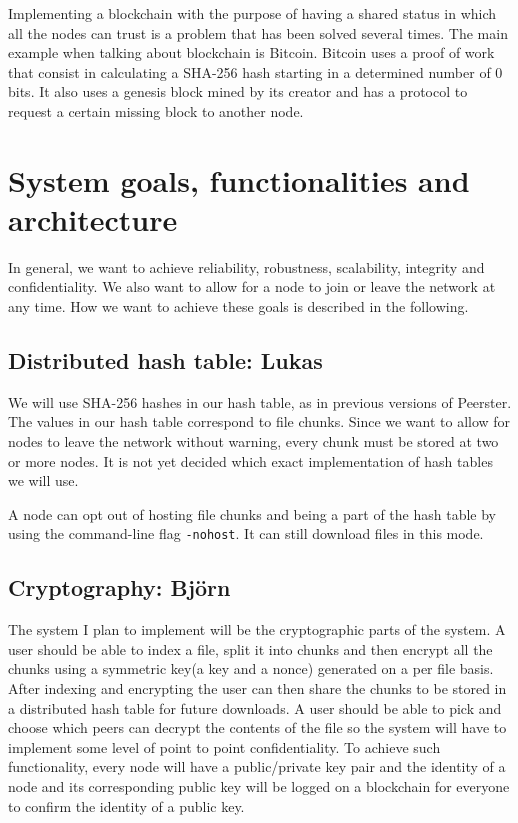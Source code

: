 \documentclass[12pt,a4paper,draft]{article}
\begin{document}
Implementing a blockchain with the purpose of having a shared status in which all the nodes can trust is a problem that has been solved several times. The main example when talking about blockchain is Bitcoin. Bitcoin uses a proof of work that consist in calculating a SHA-256 hash starting in a determined number of 0 bits. It also uses a genesis block mined by its creator and has a protocol to request a certain missing block to another node.

\section{System goals, functionalities and architecture}

In general, we want to achieve reliability, robustness, scalability, integrity and confidentiality.
We also want to allow for a node to join or leave the network at any time.
How we want to achieve these goals is described in the following.

\subsection{Distributed hash table: Lukas}

We will use SHA-256 hashes in our hash table, as in previous versions of Peerster.
The values in our hash table correspond to file chunks.
Since we want to allow for nodes to leave the network without warning, every chunk must be stored at two or more nodes.
It is not yet decided which exact implementation of hash tables we will use.

A node can opt out of hosting file chunks and being a part of the hash table by using the command-line flag \texttt{-nohost}.
It can still download files in this mode.

\subsection{Cryptography: Björn}

The system I plan to implement will be the cryptographic parts of the system. A user should be able to index a file, split it into chunks and then encrypt all the chunks using a symmetric key(a key and a nonce) generated on a per file basis. After indexing and encrypting the user can then share the chunks to be stored in a distributed hash table for future downloads. A user should be able to pick and choose which peers can decrypt the contents of the file so the system will have to implement some level of point to point confidentiality. To achieve such functionality, every node will have a public/private key pair and the identity of a node and its corresponding public key will be logged on a blockchain for everyone to confirm the identity of a public key.
\end{document}
